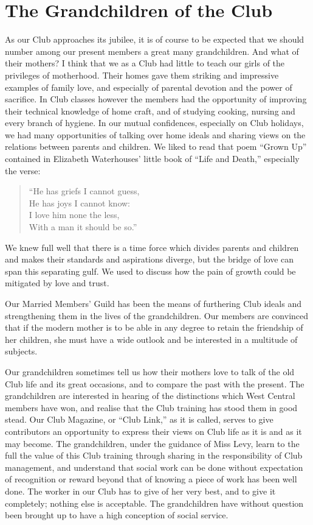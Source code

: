 \chapter{The Grandchildren of the Club}

As our Club approaches its jubilee, it is of course to be
expected that we should number among our present members
a great many grandchildren. And what of their
mothers? I think that we as a Club had little to teach
our girls of the privileges of motherhood. Their
homes gave them striking and impressive examples of
family love, and especially of parental devotion and the
power of sacrifice. In Club classes however the members
had the opportunity of improving their technical knowledge
of home craft, and of studying cooking, nursing and
every branch of hygiene. In our mutual confidences,
especially on Club holidays, we had many opportunities
of talking over home ideals and sharing views on the
relations between parents and children. We liked to read
that poem “Grown Up” contained in Elizabeth Waterhouses’
little book of “Life and Death,” especially the
verse:

\begin{verse}
“He has griefs I cannot guess,\\
He has joys I cannot know:\\
I love him none the less,\\
With a man it should be so.”
\end{verse}

We knew full well that there is a time force which divides
parents and children and makes their standards and
aspirations diverge, but the bridge of love can span
this separating gulf. We used to discuss how the pain of
growth could be mitigated by love and trust.

Our Married Members’ Guild has been the means of
furthering Club ideals and strengthening them in the lives
of the grandchildren. Our members are convinced that if
the modern mother is to be able in any degree to retain
the friendship of her children, she must have a wide
outlook and be interested in a multitude of subjects.

Our grandchildren sometimes tell us how their mothers
love to talk of the old Club life and its great occasions,
and to compare the past with the present. The grandchildren
are interested in hearing of the distinctions
which West Central members have won, and realise that
the Club training has stood them in good stead. Our
Club Magazine, or “Club Link,” as it is called, serves to
give contributors an opportunity to express their views on
Club life as it is and as it may become. The grandchildren,
under the guidance of Miss Levy, learn to the
full the value of this Club training through sharing in
the responsibility of Club management, and understand
that social work can be done without expectation of
recognition or reward beyond that of knowing a piece of
work has been well done. The worker in our Club has to
give of her very best, and to give it completely; nothing
else is acceptable. The grandchildren have without question
been brought up to have a high conception of social
service.

